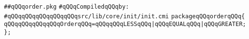 \label{src/lib/core/init/order.pkg}
\verb|##qQQqorder.pkg|\newline
\newline
\verb|#qQQqCompiledqQQqby:|\newline
\verb|#qQQqqQQqqQQqqQQqqQQqsrc/lib/core/init/init.cmi|\newline
\newline
\verb|packageqQQqorderqQQq{|\newline
\newline
\verb|qQQqqQQqqQQqqQQqOrderqQQq=qQQqqQQqLESSqQQq|\verb#|qQQqEQUALqQQq|qQQqGREATER;#\newline
\verb|};|\newline
\newline
\newline

